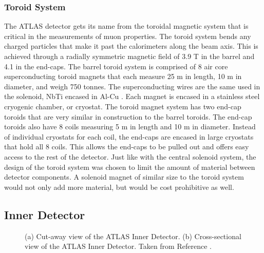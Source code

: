 	\subsubsection{Toroid System}\label{sssec:toroid}
		The \gls{ATLAS} detector gets its name from the toroidal magnetic system that is critical in the measurements of muon properties. The toroid system bends any charged particles that make it past the calorimeters along the beam axis. This is achieved through a radially symmetric magnetic field of 3.9 T in the barrel and 4.1 in the end-caps. The barrel toroid system is comprised of 8 air core superconducting toroid magnets that each measure 25 m in length, 10 m in diameter, and weigh 750 tonnes. The superconducting wires are the same used in the solenoid, NbTi encased in Al-Cu \cite{atlas-toroid}. Each magnet is encased in a stainless steel cryogenic chamber, or cryostat. The toroid magnet system has two end-cap toroids that are very similar in construction to the barrel toroids. The end-cap toroids also have 8 coils measuring 5 m in length and 10 m in diameter. Instead of individual cryostats for each coil, the end-caps are encased in large cryostats that hold all 8 coils. This allows the end-caps to be pulled out and offers easy access to the rest of the detector. Just like with the central solenoid system, the design of the toroid system was chosen to limit the amount of material between detector components. A solenoid magnet of similar size to the toroid system would not only add more material, but would be cost prohibitive as well.


	\subsection{Inner Detector}\label{ssec:ID}
		\begin{figure}[!ht]
		\centering
		\caption{\label{fig:ATLAS-ID} (a) Cut-away view of the \gls{ATLAS} Inner Detector. (b) Cross-sectional view of the ATLAS Inner Detector. Taken from Reference \cite{atlas-schematics}.}
		\end{figure}

